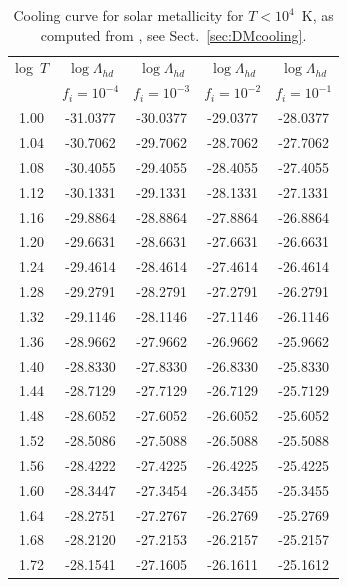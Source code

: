 \documentclass[floatfix,traditabstract,preprint2]{aa}
\begin{document}



\clearpage

\begin{table}[!htbp]
\centering                 
\caption{\textrm{Cooling curve for solar metallicity for $T<10^4$~K}, as computed from \citet{1972DalgarnoMcCray}, see Sect.~\ref{sec:DMcooling}.}           
\label{table:DMsolar}        
\begin{tabular}{c  c c c c}       
\hline\hline                    
log~$T$& $\log \Lambda_{hd}$ &$\log \Lambda_{hd}$ &$\log \Lambda_{hd}$ & $\log \Lambda_{hd}$ \\
 &$f_i=10^{-4}$ & $f_i=10^{-3}$ &$f_i=10^{-2}$ & $f_i=10^{-1}$\\
\hline
 1.00  & -31.0377  & -30.0377  & -29.0377  & -28.0377\\
 1.04  & -30.7062  & -29.7062  & -28.7062  & -27.7062\\
 1.08  & -30.4055  & -29.4055  & -28.4055  & -27.4055\\
 1.12  & -30.1331  & -29.1331  & -28.1331  & -27.1331\\
 1.16  & -29.8864  & -28.8864  & -27.8864  & -26.8864\\
 1.20  & -29.6631  & -28.6631  & -27.6631  & -26.6631\\
 1.24  & -29.4614  & -28.4614  & -27.4614  & -26.4614\\
 1.28  & -29.2791  & -28.2791  & -27.2791  & -26.2791\\
 1.32  & -29.1146  & -28.1146  & -27.1146  & -26.1146\\
 1.36  & -28.9662  & -27.9662  & -26.9662  & -25.9662\\
 1.40  & -28.8330  & -27.8330  & -26.8330  & -25.8330\\
 1.44  & -28.7129  & -27.7129  & -26.7129  & -25.7129\\
 1.48  & -28.6052  & -27.6052  & -26.6052  & -25.6052\\
 1.52  & -28.5086  & -27.5088  & -26.5088  & -25.5088\\
 1.56  & -28.4222  & -27.4225  & -26.4225  & -25.4225\\
 1.60  & -28.3447  & -27.3454  & -26.3455  & -25.3455\\
 1.64  & -28.2751  & -27.2767  & -26.2769  & -25.2769\\
 1.68  & -28.2120  & -27.2153  & -26.2157  & -25.2157\\
 1.72  & -28.1541  & -27.1605  & -26.1611  & -25.1612\\

\end{tabular}
\end{table}
\end{document}
